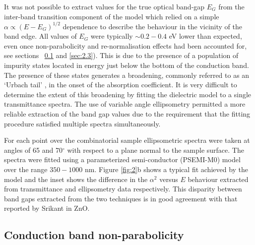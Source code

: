 \documentclass[aps,prl,preprint,showpacs,showkeys, linenumbers]{revtex4-1}
\begin{document}
It was not possible to extract values for the true optical band-gap $E_G$ from the inter-band transition component of the model which relied on a simple $\alpha\propto(E-E_G)^{1/2}$ dependence to describe the behaviour in the vicinity of the band edge. All values of $E_G$ were typically $\sim 0.2-0.4$ eV lower than expected, even once non-parabolicity and re-normalisation effects had been accounted for, see sections ~\ref{sec:2.2} and \ref{sec:2.3}).  This is due to the presence of a population of impurity states located in energy just below the bottom of the conduction band. The presence of these states generates a broadening, commonly referred to as an `Urbach tail' \cite{Urbach1953}, in the onset of the absorption coefficient. It is very difficult to determine the extent of this broadening by fitting the dielectric model to a single transmittance spectra. The use of variable angle ellipsometry permitted a more reliable extraction of the band gap values due to the requirement that the fitting procedure satisfied multiple spectra simultaneously.

For each point over the combinatorial sample ellipsometric spectra were taken at angles of 65 and 70$^{\circ}$ with respect to a plane normal to the sample surface. The spectra were fitted using a parameterized semi-conductor (PSEMI-M0) model \cite{Paulson1998} over the range $350 - 1000$ nm. Figure \ref{fig:2}b shows a typical fit achieved by the model and the inset shows the difference in the $\alpha^2$ versus $E$ behaviour extracted from transmittance and ellipsometry data respectively. This disparity between band gaps extracted from the two techniques is in good agreement with that reported by Srikant \cite{Srikant1998} in ZnO.

\subsection{ Conduction band non-parabolicity}
\label{sec:2.2}
\end{document}
